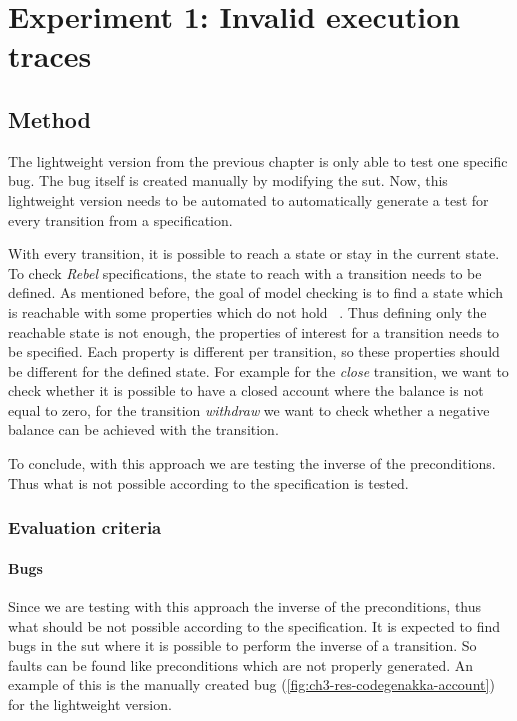 \chapter{Experiment 1: Invalid execution traces}\label{sec:ch4}


\section{Method}

The lightweight version from the previous chapter is only able to test one specific
bug. The bug itself is created manually by modifying the \gls{sut}. Now,
this lightweight version needs to be automated to automatically generate a test
for every transition from a specification.

With every transition, it is possible to reach a state or stay in the current
state. To check \textit{Rebel} specifications, the state to reach with a transition needs
to be defined. As mentioned before, the goal of model checking is to find a
state which is reachable with some properties which do not hold
~\cite[p.~5]{stoel_storm_vinju_bosman_2016}. Thus defining only the reachable
state is not enough, the properties of interest for a transition needs to be
specified. Each property is different per transition, so these properties should
be different for the defined state. For example for the \textit{close}
transition, we want to check whether it is possible to have a closed account
where the balance is not equal to zero, for the transition \textit{withdraw} we
want to check whether a negative balance can be achieved with the transition.

To conclude, with this approach we are testing the inverse of the preconditions.
Thus what is not possible according to the specification is tested.

\subsection{Evaluation criteria}\label{sec:ch4-eval-criteria}

\subsubsection{Bugs}
Since we are testing with this approach the inverse of the preconditions, thus
what should be not possible according to the specification. It is expected to
find bugs in the \gls{sut} where it is possible to perform the inverse of a
transition. So faults can be found like preconditions which are not properly
generated. An example of this is the manually created bug
(\autoref{fig:ch3-res-codegenakka-account}) for the lightweight version.

